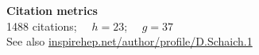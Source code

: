 \renewenvironment{spacelist} {
  \begin{list} {} {
    \setlength{\topsep}{-8 pt}
    \setlength{\itemsep}{5 pt}
    \setlength{\leftmargin}{-1.15 in}
  }
}{
  \end{list}
}

\raggedright

\begin{spacelist}
  \item {\large \bfseries Citation metrics} \\[6 pt]
  1488 citations; \ \ \href{https://en.wikipedia.org/wiki/H-index}{$h = 23$}; \ \ \href{https://en.wikipedia.org/wiki/G-index}{$g = 37$} \\[2 pt]
  See also \href{http://inspirehep.net/author/profile/D.Schaich.1}{inspirehep.net/author/profile/D.Schaich.1} \\[15 pt]


\end{spacelist}
